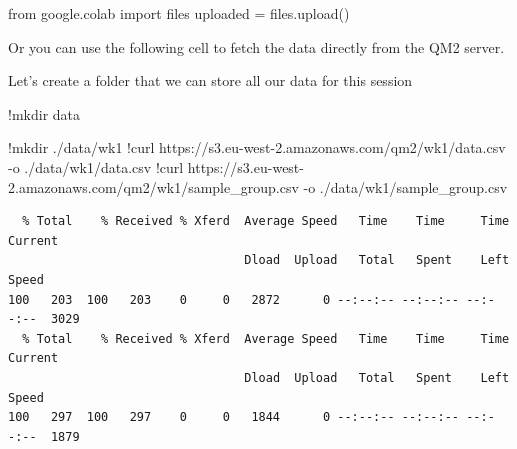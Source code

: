 \documentclass[
  letterpaper,
  DIV=11,
  numbers=noendperiod]{scrreprt}
\newenvironment{Shaded}{\begin{snugshade}}{\end{snugshade}}
\newcommand{\ErrorTok}[1]{\textcolor[rgb]{0.68,0.00,0.00}{#1}}
\newcommand{\FloatTok}[1]{\textcolor[rgb]{0.68,0.00,0.00}{#1}}
\newcommand{\ImportTok}[1]{\textcolor[rgb]{0.00,0.46,0.62}{#1}}
\newcommand{\NormalTok}[1]{\textcolor[rgb]{0.00,0.23,0.31}{#1}}
\newcommand{\OperatorTok}[1]{\textcolor[rgb]{0.37,0.37,0.37}{#1}}
\begin{document}
\begin{Shaded}
\begin{Highlighting}[]
\ImportTok{from}\NormalTok{ google.colab }\ImportTok{import}\NormalTok{ files}
\NormalTok{uploaded }\OperatorTok{=}\NormalTok{ files.upload()}
\end{Highlighting}
\end{Shaded}

Or you can use the following cell to fetch the data directly from the
QM2 server.

Let's create a folder that we can store all our data for this session

\begin{Shaded}
\begin{Highlighting}[]
\OperatorTok{!}\NormalTok{mkdir data}
\end{Highlighting}
\end{Shaded}

\begin{Shaded}
\begin{Highlighting}[]
\OperatorTok{!}\NormalTok{mkdir .}\OperatorTok{/}\NormalTok{data}\OperatorTok{/}\NormalTok{wk1}
\OperatorTok{!}\NormalTok{curl https:}\OperatorTok{//}\NormalTok{s3.eu}\OperatorTok{{-}}\NormalTok{west}\OperatorTok{{-}}\FloatTok{2.}\ErrorTok{amazonaws}\NormalTok{.com}\OperatorTok{/}\NormalTok{qm2}\OperatorTok{/}\NormalTok{wk1}\OperatorTok{/}\NormalTok{data.csv }\OperatorTok{{-}}\NormalTok{o .}\OperatorTok{/}\NormalTok{data}\OperatorTok{/}\NormalTok{wk1}\OperatorTok{/}\NormalTok{data.csv}
\OperatorTok{!}\NormalTok{curl https:}\OperatorTok{//}\NormalTok{s3.eu}\OperatorTok{{-}}\NormalTok{west}\OperatorTok{{-}}\FloatTok{2.}\ErrorTok{amazonaws}\NormalTok{.com}\OperatorTok{/}\NormalTok{qm2}\OperatorTok{/}\NormalTok{wk1}\OperatorTok{/}\NormalTok{sample\_group.csv }\OperatorTok{{-}}\NormalTok{o .}\OperatorTok{/}\NormalTok{data}\OperatorTok{/}\NormalTok{wk1}\OperatorTok{/}\NormalTok{sample\_group.csv}
\end{Highlighting}
\end{Shaded}

\begin{verbatim}
  % Total    % Received % Xferd  Average Speed   Time    Time     Time  Current
                                 Dload  Upload   Total   Spent    Left  Speed
100   203  100   203    0     0   2872      0 --:--:-- --:--:-- --:--:--  3029
  % Total    % Received % Xferd  Average Speed   Time    Time     Time  Current
                                 Dload  Upload   Total   Spent    Left  Speed
100   297  100   297    0     0   1844      0 --:--:-- --:--:-- --:--:--  1879
\end{verbatim}
\end{document}
